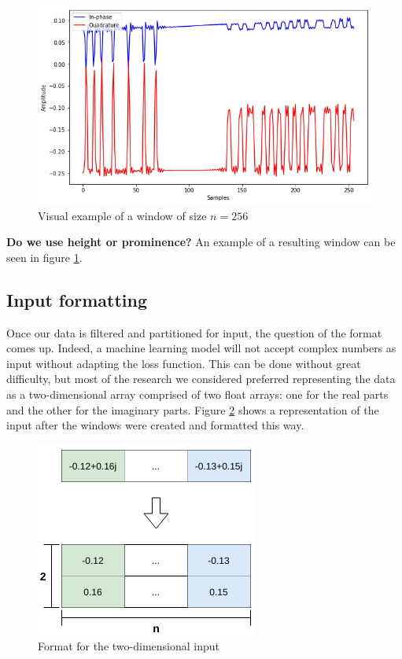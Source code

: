 \begin{figure}[htbp!]
  \centering
  \includegraphics[scale=0.55]{figures/dataprep_window.png}
  \caption{Visual example of a window of size $n = 256$}
  \label{fig:window}
\end{figure}

\textbf{Do we use height or prominence?} An example of a resulting window can be seen in figure \ref{fig:window}.

\subsection{Input formatting}

Once our data is filtered and partitioned for input, the question of the format comes up. Indeed, a machine learning model will not accept complex numbers as input without adapting the loss function. This can be done without great difficulty, but most of the research we considered preferred representing the data as a two-dimensional array comprised of two float arrays: one for the real parts and the other for the imaginary parts. Figure \ref{fig:2din} shows a representation of the input after the windows were created and formatted this way.

\begin{figure}[htbp!]
  \centering
  \includegraphics[scale=0.75]{figures/dataprep_2d.png}
  \caption{Format for the two-dimensional input}
  \label{fig:2din}
\end{figure}

